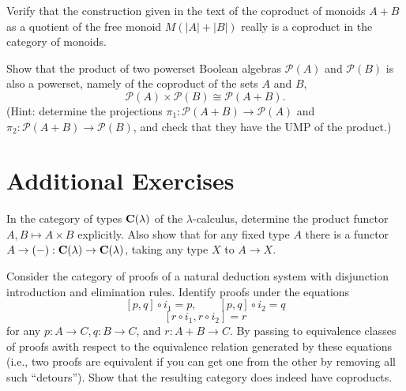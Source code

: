 \begin{BookProblem}{3}
  Verify that the construction given in the text of the coproduct of monoids \(A
  + B\) as a quotient of the free monoid \(M(|A| + |B|)\) really is a coproduct
  in the category of monoids.
  \begin{Solution}
  \end{Solution}
\end{BookProblem}

\begin{BookProblem}{4}
  Show that the product of two powerset Boolean algebras \(\mathcal{P}(A)\) and
  \(\mathcal{P}(B)\) is also a powerset, namely of the coproduct of the sets
  \(A\) and \(B\),
  \[\mathcal{P}(A) \times \mathcal{P}(B) \cong \mathcal{P}(A + B).\]
  (Hint: determine the projections \(\pi_1 : \mathcal{P}(A + B) \to
  \mathcal{P}(A)\) and \(\pi_2: \mathcal{P}(A + B) \to \mathcal{P}(B)\), and
  check that they have the UMP of the product.)
  \begin{Solution}
  \end{Solution}
\end{BookProblem}

\section{Additional Exercises}
\begin{problem}[Awodey, 2.16]
  In the category of types \(\mathbf{{C}}(\lambda)\) of the \(\lambda\)-calculus,
  determine the product functor \(A, B \mapsto A \times B\) explicitly. Also
  show that for any fixed type \(A\) there is a functor \(A \to (-) :
  \mathbf{{C}}(\lambda) \to \mathbf{{C}}(\lambda)\), taking any type \(X\) to \(A \to X\).
\end{problem}

\begin{problem}[Awodey, 3.5]
  Consider the category of proofs of a natural deduction system with disjunction
  introduction and elimination rules. Identify proofs under the equations
  \[[p,q] \circ i_1 = p,\quad\quad [p,q] \circ i_2 = q\]
  \[[r \circ i_1, r \circ i_2] = r\]
  for any \(p : A \to C, q : B \to C\), and \(r : A + B \to C\). By passing to
  equivalence classes of proofs awith respect to the equivalence relation
  generated by these equations (i.e., two proofs are equivalent if you can get
  one from the other by removing all such ``detours''). Show that the resulting
  category does indeed have coproducts.
  \begin{Solution}
  \end{Solution}
\end{problem}


